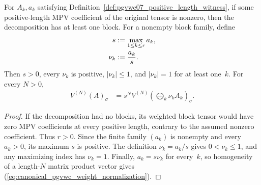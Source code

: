 \begin{lemma}%
    \label{thm:pgvwc07_positive_length_weight_normalization}
    \leanok
    For $A_k,a_k$ satisfying Definition~\ref{def:pgvwc07_positive_length_witness},
    if some positive-length MPV coefficient of the original tensor is
    nonzero, then the decomposition has at least one block. For a nonempty
    block family, define
    \begin{align}
        s
         & :=\max_{1\le k\le r}a_k,
        \notag                      \\
        \nu_k
         & :=\frac{a_k}{s}.
        \notag
    \end{align}
    Then $s>0$, every $\nu_k$ is positive, $|\nu_k|\le1$, and
    $|\nu_k|=1$ for at least one~$k$. For every $N>0$,
    \begin{align}
        V^{(N)}(A)_\sigma
         & =s^N
        V^{(N)}\!\left(\bigoplus_k\nu_kA_k\right)_\sigma.
        \label{eq:canonical_pgvwc_weight_normalization}
    \end{align}
\end{lemma}

\begin{proof}\leanok
    If the decomposition had no blocks, its weighted block tensor would have
    zero MPV coefficients at every positive length, contrary to the assumed nonzero
    coefficient. Thus $r>0$. Since the finite family $(a_k)$ is nonempty and
    every $a_k>0$, its maximum $s$ is positive. The definition
    $\nu_k=a_k/s$ gives $0<\nu_k\le1$, and any maximizing index has
    $\nu_k=1$. Finally, $a_k=s\nu_k$ for every~$k$, so homogeneity of a
    length-$N$ matrix product vector gives
    (\ref{eq:canonical_pgvwc_weight_normalization}).
\end{proof}

